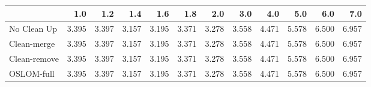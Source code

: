 \begin{tabular}{lrrrrrrrrrrr}
\toprule
{} &   1.0 &   1.2 &   1.4 &   1.6 &   1.8 &   2.0 &   3.0 &   4.0 &   5.0 &   6.0 &   7.0 \\
\midrule
No Clean Up  & 3.395 & 3.397 & 3.157 & 3.195 & 3.371 & 3.278 & 3.558 & 4.471 & 5.578 & 6.500 & 6.957 \\
Clean-merge  & 3.395 & 3.397 & 3.157 & 3.195 & 3.371 & 3.278 & 3.558 & 4.471 & 5.578 & 6.500 & 6.957 \\
Clean-remove & 3.395 & 3.397 & 3.157 & 3.195 & 3.371 & 3.278 & 3.558 & 4.471 & 5.578 & 6.500 & 6.957 \\
OSLOM-full   & 3.395 & 3.397 & 3.157 & 3.195 & 3.371 & 3.278 & 3.558 & 4.471 & 5.578 & 6.500 & 6.957 \\
\bottomrule
\end{tabular}
